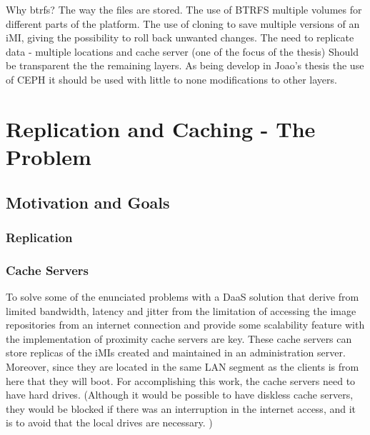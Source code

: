 Why btrfs?
The way the files are stored.
The use of BTRFS multiple volumes for different parts of the platform.
The use of cloning to save multiple versions of an iMI, giving the possibility to roll back unwanted changes.
The need to replicate data - multiple locations and cache server (one of the focus of the thesis)
Should be transparent the the remaining layers. As being develop in Joao's thesis the use of CEPH it should be used with little to none modifications to other layers.


\section{Replication and Caching - The Problem}
\label{sec:replication_cache}


\subsection{Motivation and Goals}
\label{sub:motivation_goals}

\subsubsection{Replication}

\subsubsection{Cache Servers}

To solve some of the enunciated problems with a DaaS solution that derive from limited bandwidth, latency and jitter from the limitation of accessing the image repositories from an internet connection and provide some scalability feature with the implementation of proximity cache servers are key. These cache servers can store replicas of the iMIs created and maintained in an administration server. Moreover, since they are located in the same LAN segment as the clients is from here that they will boot.
For accomplishing this work, the cache servers need to have hard drives. (Although it would be possible to have diskless cache servers, they would be blocked if there was an interruption in the internet access, and it is to avoid that the local drives are necessary. )


